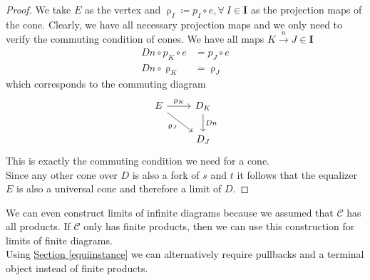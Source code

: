 \begin{proof}
We take $E$ as the vertex and
$\uprho_I \coloneqq p_I \circ e, \forall\ I \in \bm I$
as the projection maps of the cone.
Clearly, we have all necessary projection maps and we only need to verify
the commuting condition of cones.
We have all maps $K \overset{n}{\rightarrow} J \in \bm I$
\begin{align*}
  Dn \circ p_K \circ e &= p_J \circ e \\
  Dn \circ \uprho_K &= \uprho_J
\end{align*}
which corresponds to the commuting diagram
\[
  \begin{tikzcd}
    E \arrow{r}{\uprho_K} \arrow{dr}[swap]{\uprho_J} & D_K \arrow{d}{Dn}\\
    & D_J
  \end{tikzcd}
\]
This is exactly the commuting condition we need for a cone.\\
Since any other cone over $D$
is also a fork of $s$ and $t$
it follows that the equalizer $E$ is also a universal cone
and therefore a limit of $D$.
\end{proof}
\begin{remark}
  We can even construct limits of infinite diagrams
  because we assumed that $\mathscr C$ has all products.
  If $\mathscr C$ only has finite products, then we can
  use this construction for
  limits of finite diagrams.\\
  Using \hyperref[equiinstance]{Section \ref*{equiinstance}}
  we can alternatively require pullbacks and a terminal object instead of finite products.
\end{remark}

